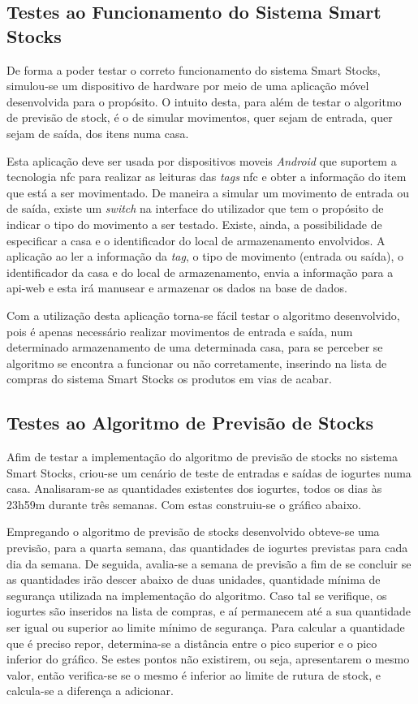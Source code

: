 \subsection{Testes ao Funcionamento do Sistema Smart Stocks}\label{subsec352}

De forma a poder testar o correto funcionamento do sistema Smart Stocks, simulou-se um dispositivo de hardware por meio de uma aplicação móvel desenvolvida para o propósito. O intuito desta, para além de testar o algoritmo de previsão de stock, é o de simular movimentos, quer sejam de entrada, quer sejam de saída, dos itens numa casa.

Esta aplicação deve ser usada por dispositivos moveis \textit{Android} que suportem a tecnologia \acrshort{nfc} para realizar as leituras das \textit{tags} \acrshort{nfc} e obter a informação do item que está a ser movimentado. De maneira a simular um movimento de entrada ou de saída, existe um \textit{switch} na interface do utilizador que tem o propósito de indicar o tipo do movimento a ser testado. Existe, ainda, a possibilidade de especificar a casa e o identificador do local de armazenamento envolvidos. A aplicação ao ler a informação da \textit{tag}, o tipo de movimento (entrada ou saída), o identificador da casa e do local de armazenamento, envia a informação para a \gls{api-web} e esta irá manusear e armazenar os dados na base de dados.

Com a utilização desta aplicação torna-se fácil testar o algoritmo desenvolvido, pois é apenas necessário realizar movimentos de entrada e saída, num determinado armazenamento de uma determinada casa, para se perceber se algoritmo se encontra a funcionar ou não corretamente, inserindo na lista de compras do sistema Smart Stocks os produtos em vias de acabar.

\subsection{Testes ao Algoritmo de Previsão de Stocks}\label{subsec353}

Afim de testar a implementação do algoritmo de previsão de stocks no sistema Smart Stocks, criou-se um cenário de teste de entradas e saídas de iogurtes numa casa. Analisaram-se as quantidades existentes dos iogurtes, todos os dias às 23h59m durante três semanas. Com estas construiu-se o gráfico abaixo.

Empregando o algoritmo de previsão de stocks desenvolvido obteve-se uma previsão, para a quarta semana, das quantidades de iogurtes previstas para cada dia da semana. De seguida, avalia-se a semana de previsão a fim de se concluir se as quantidades irão descer abaixo de duas unidades, quantidade mínima de segurança utilizada na implementação do algoritmo. Caso tal se verifique, os iogurtes são inseridos na lista de compras, e aí permanecem até a sua quantidade ser igual ou superior ao limite mínimo de segurança. Para calcular a quantidade que é preciso repor, determina-se a distância entre o pico superior e o pico inferior do gráfico. Se estes pontos não existirem, ou seja, apresentarem o mesmo valor, então verifica-se se o mesmo é inferior ao limite de rutura de stock, e calcula-se a diferença a adicionar. 

